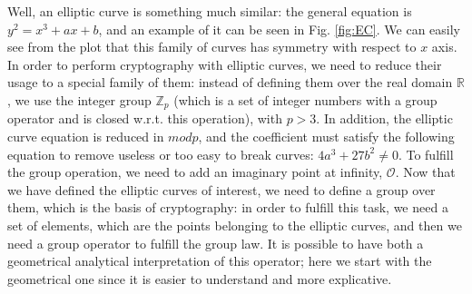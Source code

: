\documentclass{article}
\begin{document}
 Well, an elliptic curve is something much similar: the general equation is $y^2 = x^3 + ax + b$, and an example of it can be seen in Fig. \ref{fig:EC}. We can easily see from the plot that this family of curves has symmetry with respect to $x$ axis. \newline
 In order to perform cryptography with elliptic curves, we need to reduce their usage to a special family of them: instead of defining them over the real domain $\mathbb{R}$, we use the integer group $\mathbb{Z}_{p}$ (which is a set of integer numbers with a group operator and is closed w.r.t. this operation), with $p > 3$. In addition, the elliptic curve equation is reduced in $mod p$, and the coefficient must satisfy the following equation to remove useless or too easy to break curves: $4a^3 + 27b^2 \ne{0}$. To fulfill the group operation, we need to add an imaginary point at infinity, $\mathcal{O}$. \newline
 Now that we have defined the elliptic curves of interest, we need to define a group over them, which is the basis of cryptography: in order to fulfill this task, we need a set of elements, which are the points belonging to the elliptic curves, and then we need a group operator to fulfill the group law. It is possible to have both a geometrical analytical interpretation of this operator; here we start with the geometrical one since it is easier to understand and more explicative.
 
\end{document}
